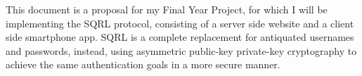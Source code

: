 This document is a proposal for my Final Year Project, for which I will be implementing the SQRL protocol, consisting of a server side website and a client side smartphone app. SQRL is a complete replacement for antiquated usernames and passwords, instead, using asymmetric public-key private-key cryptography to achieve the same authentication goals in a more secure manner.
